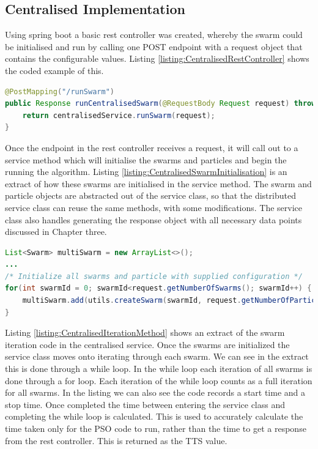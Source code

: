 \documentclass[oneside,12pt]{book}
\begin{document}
\subsection{Centralised Implementation}
Using spring boot a basic rest controller was created, whereby the swarm could be initialised and run by calling one POST endpoint with a request object that contains the configurable values. Listing \ref{listing:CentralisedRestController} shows the coded example of this. 
\begin{lstlisting}[basicstyle=\footnotesize, language=Java]
@PostMapping("/runSwarm")
public Response runCentralisedSwarm(@RequestBody Request request) throws Exception {
    return centralisedService.runSwarm(request);
}
\end{lstlisting}
\label{listing:CentralisedRestController}

Once the endpoint in the rest controller receives a request, it will call out to a service method which will initialise the swarms and particles and begin the running the algorithm. Listing \ref{listing:CentralisedSwarmInitialisation} is an extract of how these swarms are initialised in the service method. The swarm and particle objects are abstracted out of the service class, so that the distributed service class can reuse the same methods, with some modifications. The service class also handles generating the response object with all necessary data points discussed in Chapter three. 

\begin{lstlisting}[basicstyle=\footnotesize, language=Java]
List<Swarm> multiSwarm = new ArrayList<>();
...
/* Initialize all swarms and particle with supplied configuration */
for(int swarmId = 0; swarmId<request.getNumberOfSwarms(); swarmId++) {
    multiSwarm.add(utils.createSwarm(swarmId, request.getNumberOfParticles(), request.getConfigVariables()));
}
\end{lstlisting}
\label{listing:CentralisedSwarmInitialisation}

Listing \ref{listing:CentralisedIterationMethod} shows an extract of the swarm iteration code in the centralised service. Once the swarms are initialized the service class moves onto iterating through each swarm. We can see in the extract this is done through a while loop. In the while loop each iteration of all swarms is done through a for loop. Each iteration of the while loop counts as a full iteration for all swarms. In the listing we can also see the code records a start time and a stop time. Once completed the time between entering the service class and completing the while loop is calculated. This is used to accurately calculate the time taken only for the PSO code to run, rather than the time to get a response from the rest controller. This is returned as the TTS value. 
\end{document}
